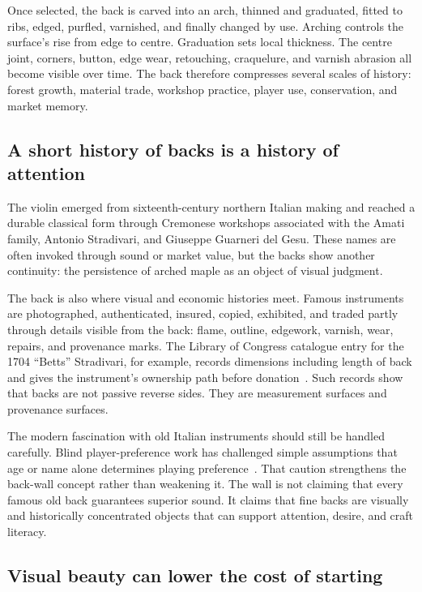 \documentclass[12pt,letterpaper]{article}
\begin{document}
Once selected, the back is carved into an arch, thinned and graduated, fitted to ribs, edged, purfled, varnished, and finally changed by use. Arching controls the surface's rise from edge to centre. Graduation sets local thickness. The centre joint, corners, button, edge wear, retouching, craquelure, and varnish abrasion all become visible over time. The back therefore compresses several scales of history: forest growth, material trade, workshop practice, player use, conservation, and market memory.

\subsection{A short history of backs is a history of attention}

The violin emerged from sixteenth-century northern Italian making and reached a durable classical form through Cremonese workshops associated with the Amati family, Antonio Stradivari, and Giuseppe Guarneri del Gesu. These names are often invoked through sound or market value, but the backs show another continuity: the persistence of arched maple as an object of visual judgment.

The back is also where visual and economic histories meet. Famous instruments are photographed, authenticated, insured, copied, exhibited, and traded partly through details visible from the back: flame, outline, edgework, varnish, wear, repairs, and provenance marks. The Library of Congress catalogue entry for the 1704 ``Betts'' Stradivari, for example, records dimensions including length of back and gives the instrument's ownership path before donation~\cite{loc_betts_1704}. Such records show that backs are not passive reverse sides. They are measurement surfaces and provenance surfaces.

The modern fascination with old Italian instruments should still be handled carefully. Blind player-preference work has challenged simple assumptions that age or name alone determines playing preference~\cite{fritz_preferences_2012}. That caution strengthens the back-wall concept rather than weakening it. The wall is not claiming that every famous old back guarantees superior sound. It claims that fine backs are visually and historically concentrated objects that can support attention, desire, and craft literacy.

\subsection{Visual beauty can lower the cost of starting}
\end{document}
